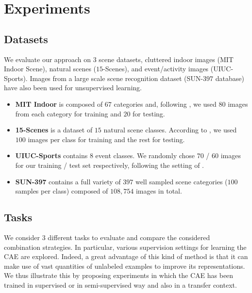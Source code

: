 \documentclass[runningheads,a4paper]{llncs}
\begin{document}
\section{Experiments} \label{sec:exp}


\subsection{Datasets}


We evaluate our approach on $3$ scene datasets, cluttered indoor images (MIT
Indoor Scene),  natural scenes ($15$-Scenes), and event/activity images
(UIUC-Sports). Images from a large scale scene recognition dataset (SUN-$397$
database) have also been used for unsupervised learning. 
\begin{itemize}
  \item {\bf{MIT Indoor}} is composed of $67$ categories and, following
\cite{LiJiaLi10,Quattoni09}, we used $80$ images from each category for
training and $20$ for testing.

\item {\bf{15-Scenes}} is a dataset of $15$ natural scene
classes. According to \cite{Lazebnik06}, we used $100$ images per class for
training and the rest for testing. 

\item {\bf{UIUC-Sports}} contains $8$ event classes.  We
randomly chose $70$ / $60$ images for our training / test set respectively,
following the setting of \cite{LiJiaLi10,LiJiaLi07}.

\item {\bf{SUN-397}} contains a full variety of $397$  well sampled
scene categories ($100$ samples per class) composed of $108,754$ images in total.
\end{itemize}





\subsection{Tasks}
\label{sec:results}

We consider $3$ different tasks to evaluate and compare the considered
combination strategies. In particular, various supervision settings
for learning the CAE are explored. Indeed, a great advantage of this
kind of method is that it can make use of vast quantities of unlabeled
examples to improve its representations. We thus illustrate this by
proposing experiments in which the CAE has been trained in supervised or
in semi-supervised way and also in a transfer context.
\end{document}
